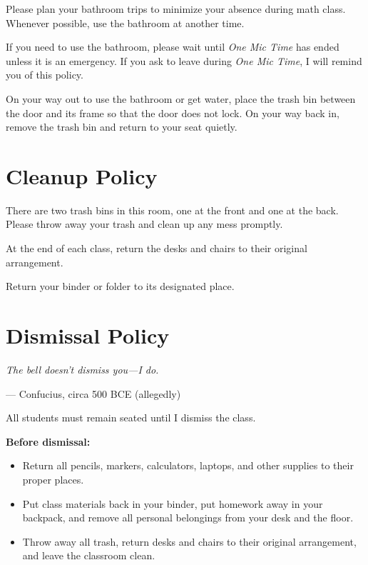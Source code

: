 \documentclass[12pt]{article}
\begin{document}
Please plan your bathroom trips to minimize your absence during math class. Whenever possible, use the bathroom at another time.

If you need to use the bathroom, please wait until \textit{One Mic Time} has ended unless it is an emergency. If you ask to leave during \textit{One Mic Time}, I will remind you of this policy.

On your way out to use the bathroom or get water, place the trash bin between the door and its frame so that the door does not lock. On your way back in, remove the trash bin and return to your seat quietly.

\section{Cleanup Policy}

There are two trash bins in this room, one at the front and one at the back. Please throw away your trash and clean up any mess promptly.

At the end of each class, return the desks and chairs to their original arrangement.

Return your binder or folder to its designated place.

\section{Dismissal Policy}

\begin{center}
    \textit{The bell doesn't dismiss you---I do.}

    \vspace{0.25em}
    --- Confucius, circa 500 BCE (allegedly)
\end{center}

All students must remain seated until I dismiss the class.

\textbf{Before dismissal:}
\begin{itemize}[label=$\bullet$]
    \item Return all pencils, markers, calculators, laptops, and other supplies to their proper places.
    \item Put class materials back in your binder, put homework away in your backpack, and remove all personal belongings from your desk and the floor.
    \item Throw away all trash, return desks and chairs to their original arrangement, and leave the classroom clean.
\end{itemize}
\end{document}
